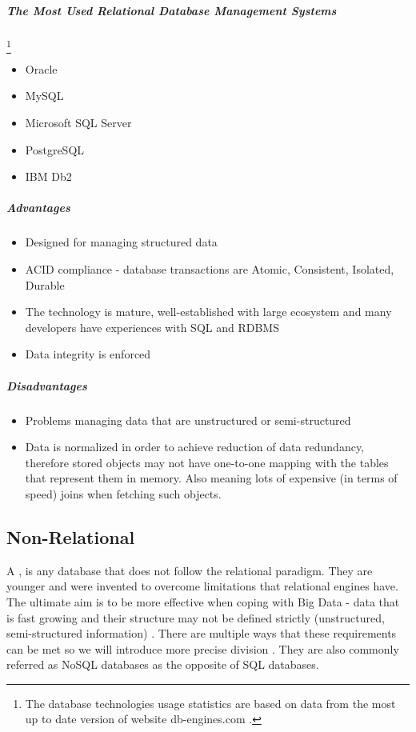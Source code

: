 \subparagraph{The Most Used Relational Database Management Systems} \footnote{The database technologies usage statistics are based on data from the most up to date version of website db-engines.com \cite{DatabaseEnginesStatistics19}.}

\begin{itemize}
	\item Oracle
	\item MySQL
	\item Microsoft SQL Server
	\item PostgreSQL
	\item IBM Db2
\end{itemize}

\subparagraph{Advantages}
\cite{RelationalVsNonRelationalDatabases1} \cite{RelationalVsNonRelationalDatabases2}

\begin{itemize}
	\item Designed for managing structured data
	\item ACID compliance - database transactions are Atomic, Consistent, Isolated, Durable
	\item The technology is mature, well-established with large ecosystem and many developers have experiences with SQL and RDBMS
	\item Data integrity is enforced
\end{itemize}

\subparagraph{Disadvantages}

\begin{itemize}
	\item Problems managing data that are unstructured or semi-structured
	\item Data is normalized in order to achieve reduction of data redundancy, therefore stored objects may not have one-to-one mapping with the tables that represent them in memory. Also meaning lots of expensive (in terms of speed) joins when fetching such objects.
\end{itemize}

\subsection{Non-Relational}
A , is any database that does not follow the relational paradigm. They are younger and were invented to overcome limitations that relational engines have. 
The ultimate aim is to be more effective when coping with Big Data - data that is fast growing and their structure may not be defined strictly (unstructured, semi-structured information) \cite{NonRelationalDBs}.
There are multiple ways that these requirements can be met so we will introduce more precise division \cite{DatabaseTypes}.
They are also commonly referred as NoSQL databases as the opposite of SQL databases.

